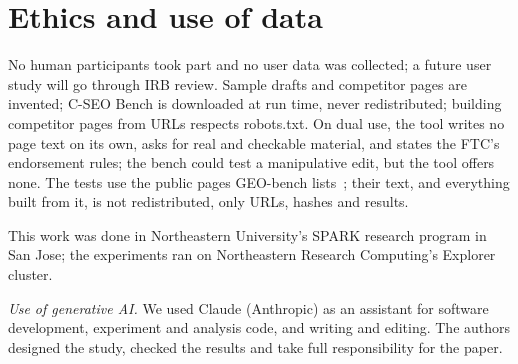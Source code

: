 \section{Ethics and use of data}\label{sec:ethics}

No human participants took part and no user data was collected; a future user study will go through IRB review.
Sample drafts and competitor pages are invented; C-SEO Bench is downloaded at run time, never redistributed; building competitor pages from URLs respects robots.txt.
On dual use, the tool writes no page text on its own, asks for real and checkable material, and states the FTC's endorsement rules; the bench could test a manipulative edit, but the tool offers none.
The tests use the public pages GEO-bench lists~\cite{aggarwal2024geo}; their text, and everything built from it, is not redistributed, only URLs, hashes and results.

\begin{acks}
This work was done in Northeastern University's SPARK research program in San Jose; the experiments ran on Northeastern Research Computing's Explorer cluster.

\emph{Use of generative AI.} We used Claude (Anthropic) as an assistant for software development, experiment and analysis code, and writing and editing. The authors designed the study, checked the results and take full responsibility for the paper.
\end{acks}
